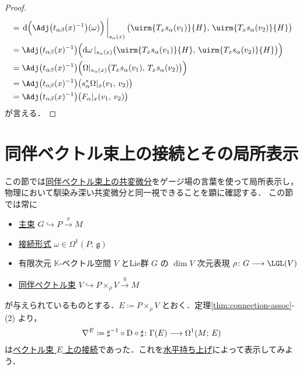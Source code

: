 \documentclass[geometry_main]{subfiles}
\begin{document}
\begin{proof}
\begin{align}
        &= \eval{\dd{\Bigl(\Adj \bigl( t_{\alpha\beta}(x)^{-1} \bigr)(\omega) \Bigr)}}_{s_\alpha(x)} \bigl( \uirm{T_x s_\alpha(v_1)}{H},\, \uirm{T_x s_\alpha(v_2)}{H} \bigr) \\
        &= \Adj \bigl( t_{\alpha\beta}(x)^{-1} \bigr) \Bigl(\dd{\omega}|_{s_\alpha(x)} \bigl( \uirm{T_x s_\alpha(v_1)}{H},\, \uirm{T_x s_\alpha(v_2)}{H} \bigr)\Bigr) \\
        &= \Adj \bigl( t_{\alpha\beta}(x)^{-1} \bigr) \Bigl(\Omega|_{s_\alpha(x)} \bigl( T_x s_\alpha(v_1),\, T_x s_\alpha(v_2) \bigr)\Bigr) \\
        &= \Adj \bigl( t_{\alpha\beta}(x)^{-1} \bigr) \bigl(s_\alpha^*\Omega|_x(v_1,\, v_2)\bigr) \\
        &= \Adj \bigl( t_{\alpha\beta}(x)^{-1} \bigr) \bigl(F_\alpha|_x(v_1,\, v_2)\bigr)
    \end{align}
    が言える．
\end{proof}

\section{同伴ベクトル束上の接続とその局所表示}

この節では\hyperref[thm:connection-assoc]{同伴ベクトル束上の共変微分}をゲージ場の言葉を使って局所表示し，物理において馴染み深い共変微分と同一視できることを顕に確認する．
この節では常に
\begin{itemize}
    \item \hyperref[def.PFD]{主束} $G \hookrightarrow P \xrightarrow{\pi} M$
    \item \hyperref[def:connection]{接続形式} $\omega \in \Omega^1(P;\, \mathfrak{g})$
    \item 有限次元 $\mathbb{K}$-ベクトル空間 $V$ とLie群 $G$ の $\dim V$ 次元表現 $\rho \colon G \lto \LGL (V)$ 
    \item \hyperref[def:associated-vect]{同伴ベクトル束} $V \hookrightarrow P \times_\rho V \xrightarrow{q} M$
\end{itemize}
が与えられているものとする．$E \coloneqq P \times_\rho V$ とおく．定理\ref{thm:connection-assoc}-(2) より，
\begin{align}
    \nabla^E \coloneqq \sharp^{-1} \circ \mathrm{D} \circ \sharp \colon \Gamma(E) \longrightarrow \Omega^1(M;\, E)
\end{align}
は\hyperref[def:connection-vect]{ベクトル束 $E$ 上の接続}であった．これを\hyperref[def:horizontal-lift-curve]{水平持ち上げ}によって表示してみよう．
\end{document}
